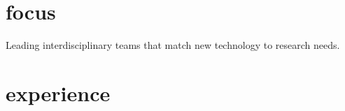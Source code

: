\documentclass[]{dmc-cv} %
\begin{document}
\section{focus}
Leading interdisciplinary teams that match new technology to research needs. 

\section{experience}
\end{document}
